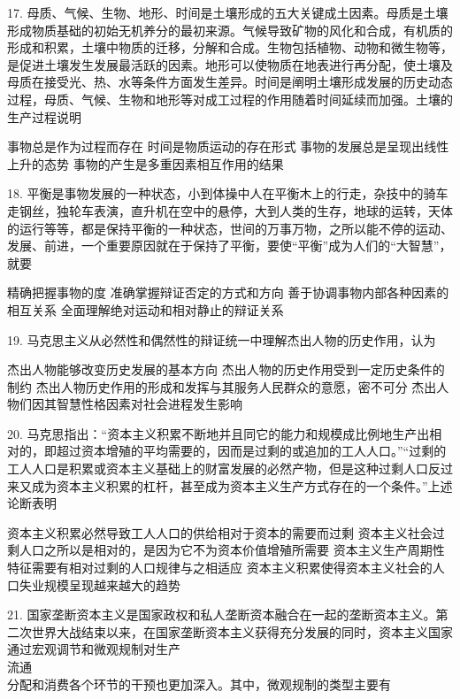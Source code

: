 17. 母质、气候、生物、地形、时间是土壤形成的五大关键成土因素。母质是土壤形成物质基础的初始无机养分的最初来源。气候导致矿物的风化和合成，有机质的形成和积累，土壤中物质的迁移，分解和合成。生物包括植物、动物和微生物等，是促进土壤发生发展最活跃的因素。地形可以使物质在地表进行再分配，使土壤及母质在接受光、热、水等条件方面发生差异。时间是阐明土壤形成发展的历史动态过程，母质、气候、生物和地形等对成工过程的作用随着时间延续而加强。土壤的生产过程说明
\begin{choices}
	 事物总是作为过程而存在
	 时间是物质运动的存在形式
	 事物的发展总是呈现出线性上升的态势
	 事物的产生是多重因素相互作用的结果
\end{choices}
18. 平衡是事物发展的一种状态，小到体操中人在平衡木上的行走，杂技中的骑车走钢丝，独轮车表演，直升机在空中的悬停，大到人类的生存，地球的运转，天体的运行等等，都是保持平衡的一种状态，世间的万事万物，之所以能不停的运动、发展、前进，一个重要原因就在于保持了平衡，要使“平衡”成为人们的“大智慧”，就要
\begin{choices}
	 精确把握事物的度
	 准确掌握辩证否定的方式和方向
	 善于协调事物内部各种因素的相互关系
	 全面理解绝对运动和相对静止的辩证关系
\end{choices}
19. 马克思主义从必然性和偶然性的辩证统一中理解杰出人物的历史作用，认为
\begin{choices}
	 杰出人物能够改变历史发展的基本方向
	 杰出人物的历史作用受到一定历史条件的制约
	 杰出人物历史作用的形成和发挥与其服务人民群众的意愿，密不可分
	 杰出人物们因其智慧性格因素对社会进程发生影响
\end{choices}
20. 马克思指出：“资本主义积累不断地并且同它的能力和规模成比例地生产出相对的，即超过资本增殖的平均需要的，因而是过剩的或追加的工人人口。”“过剩的工人人口是积累或资本主义基础上的财富发展的必然产物，但是这种过剩人口反过来又成为资本主义积累的杠杆，甚至成为资本主义生产方式存在的一个条件。”上述论断表明
\begin{choices}
	 资本主义积累必然导致工人人口的供给相对于资本的需要而过剩
	 资本主义社会过剩人口之所以是相对的，是因为它不为资本价值增殖所需要
	 资本主义生产周期性特征需要有相对过剩的人口规律与之相适应
	 资本主义积累使得资本主义社会的人口失业规模呈现越来越大的趋势
\end{choices}
21. 国家垄断资本主义是国家政权和私人垄断资本融合在一起的垄断资本主义。第二次世界大战结束以来，在国家垄断资本主义获得充分发展的同时，资本主义国家通过宏观调节和微观规制对生产\\流通\\分配和消费各个环节的干预也更加深入。其中，微观规制的类型主要有
